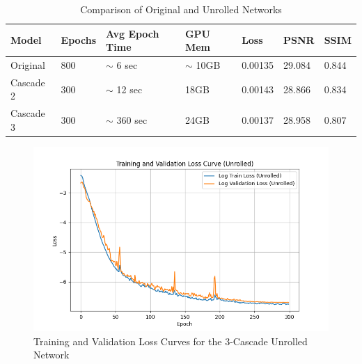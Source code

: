 \documentclass{article}
\begin{document}
\begin{table}[H]
  \caption{Comparison of Original and Unrolled Networks}
  \label{tab:unrolled_compare}
  \centering
  \begin{tabular}{lllllll}
    \toprule
    Model     & Epochs & Avg Epoch Time & GPU Mem     & Loss    & PSNR   & SSIM  \\
    \midrule
    Original  & 800    & $\sim$ 6 sec   & $\sim$ 10GB & 0.00135 & 29.084 & 0.844 \\
    Cascade 2 & 300    & $\sim$ 12 sec  & 18GB        & 0.00143 & 28.866 & 0.834 \\
    Cascade 3 & 300    & $\sim$ 360 sec & 24GB        & 0.00137 & 28.958 & 0.807 \\
    \bottomrule
  \end{tabular}
\end{table}

\begin{figure}[H]
  \centering
  \includegraphics[width=\linewidth]{../assets/Training Loss and Validation Loss Unrolled.png}
  \caption{Training and Validation Loss Curves for the 3-Cascade Unrolled Network}
  \label{fig:loss_unrolled}
\end{figure}
\end{document}
